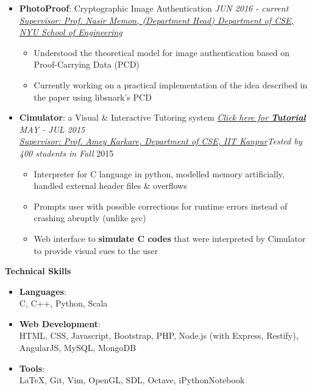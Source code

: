 \documentclass[letterpaper,11pt]{article}
\begin{document}
{\begin{itemize}
    \item \textbf{PhotoProof}: Cryptographic Image Authentication \hfill \textit{JUN 2016 - current}\\
    \href{http://engineering.nyu.edu/people/nasir-memon}{\textit{Supervisor: Prof. Nasir Memon, (Department Head) Department of CSE, NYU School of Engineering}}
    \begin{itemize}
        \item Understood the theoretical model for image authentication based on Proof-Carrying Data (PCD)
        \item Currently working on a practical implementation of the idea described in the paper using libsnark's PCD
    \end{itemize}
    \item \textbf{Cimulator}: a Visual \& Interactive Tutoring system\hspace{0.2in} \href{http://home.iitk.ac.in/~kunalkap/Cimulator.html}{\textit{Click here for \textbf{Tutorial}}} \hfill \textit{MAY - JUL 2015} \\
    \href{http://www.cse.iitk.ac.in/users/karkare/}{\textit{Supervisor: Prof. Amey Karkare, Department of CSE, IIT Kanpur}}\hfill \textit{Tested by 400 students in Fall} 2015\\
        \begin{itemize}
            \item Interpreter for C language in python, modelled memory artificially, handled external header files \& overflows
            \item Prompts user with possible corrections for runtime errors instead of crashing abruptly (unlike gcc)
            \item Web interface to \textbf{simulate C codes} that were interpreted by Cimulator to provide visual cues to the user
        \end{itemize}
\end{itemize}

\Large{\textbf{Technical Skills}}
\small
\begin{itemize}
    \item \textbf{Languages}:\\
        C, C++, Python, Scala
    \item \textbf{Web Development}:\\
        HTML, CSS, Javascript, Bootstrap, PHP, Node.js (with Express, Restify), AngularJS, MySQL, MongoDB
    \item \textbf{Tools}:\\
        \LaTeX, Git, Vim, OpenGL, SDL, Octave, iPythonNotebook
\end{itemize}

}
\end{document}
